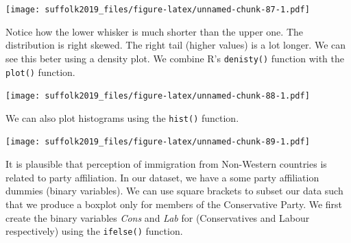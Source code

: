 \documentclass[]{article}
\newenvironment{Shaded}{\begin{snugshade}}{\end{snugshade}}
\newcommand{\CommentTok}[1]{\textcolor[rgb]{0.56,0.35,0.01}{\textit{#1}}}
\newcommand{\DataTypeTok}[1]{\textcolor[rgb]{0.13,0.29,0.53}{#1}}
\newcommand{\DecValTok}[1]{\textcolor[rgb]{0.00,0.00,0.81}{#1}}
\newcommand{\FloatTok}[1]{\textcolor[rgb]{0.00,0.00,0.81}{#1}}
\newcommand{\KeywordTok}[1]{\textcolor[rgb]{0.13,0.29,0.53}{\textbf{#1}}}
\newcommand{\NormalTok}[1]{#1}
\newcommand{\OperatorTok}[1]{\textcolor[rgb]{0.81,0.36,0.00}{\textbf{#1}}}
\newcommand{\StringTok}[1]{\textcolor[rgb]{0.31,0.60,0.02}{#1}}
\begin{document}
\texttt{[image: suffolk2019\_files/figure-latex/unnamed-chunk-87-1.pdf]}

Notice how the lower whisker is much shorter than the upper one. The distribution is right skewed. The right tail (higher values) is a lot longer. We can see this beter using a density plot. We combine R's \texttt{denisty()} function with the \texttt{plot()} function.

\begin{Shaded}
\end{Shaded}

\texttt{[image: suffolk2019\_files/figure-latex/unnamed-chunk-88-1.pdf]}

We can also plot histograms using the \texttt{hist()} function.

\begin{Shaded}
\end{Shaded}

\texttt{[image: suffolk2019\_files/figure-latex/unnamed-chunk-89-1.pdf]}

It is plausible that perception of immigration from Non-Western countries is related to party affiliation. In our dataset, we have a some party affiliation dummies (binary variables). We can use square brackets to subset our data such that we produce a boxplot only for members of the Conservative Party. We first create the binary variables \emph{Cons} and \emph{Lab} for (Conservatives and Labour respectively) using the \texttt{ifelse()} function.

\begin{Shaded}
\end{Shaded}
\end{document}
